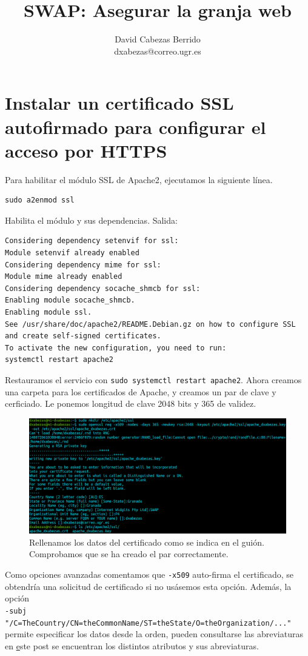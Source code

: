 \documentclass{article}
\title{\Huge SWAP: Asegurar la granja web\vspace{10mm}}
\author{\huge David Cabezas Berrido \vspace{10mm} \\ 
  \huge dxabezas@correo.ugr.es \vspace{10mm}}
\begin{document}
\maketitle
\tableofcontents
\newpage

\section{Instalar un certificado SSL autofirmado para configurar el acceso por HTTPS}

Para habilitar el módulo SSL de Apache2, ejecutamos la siguiente línea.

\begin{Verbatim}[tabsize=4]
sudo a2enmod ssl 
\end{Verbatim}
Habilita el módulo y sus dependencias. Salida:
\begin{Verbatim}[tabsize=4]
Considering dependency setenvif for ssl:
Module setenvif already enabled
Considering dependency mime for ssl:
Module mime already enabled
Considering dependency socache_shmcb for ssl:
Enabling module socache_shmcb.
Enabling module ssl.
See /usr/share/doc/apache2/README.Debian.gz on how to configure SSL and create self-signed certificates.
To activate the new configuration, you need to run:
systemctl restart apache2
\end{Verbatim}
Restauramos el servicio con \verb^sudo systemctl restart apache2^. Ahora creamos una carpeta para los certificados de Apache, y creamos un par de clave y cerficiado. Le ponemos longitud de clave 2048 bits y 365 de validez.

\begin{figure}[H]
	\centering
	\includegraphics[width=180mm]{imgs/cert-create}
	\caption{Rellenamos los datos del certificado como se indica en el guión. Comprobamos que se ha creado el par correctamente.}
	\label{fig:cert-create}
\end{figure}

Como opciones avanzadas comentamos que \texttt{-x509} auto-firma el certificado, se obtendría una solicitud de certificado si no usásemos
esta opción. Además, la opción \\ \texttt{-subj "/C=TheCountry/CN=theCommonName/ST=theState/O=theOrganization/..."} permite especificar los datos
desde la orden, pueden consultarse las abreviaturas en \href{https://stackoverflow.com/questions/6464129/certificate-subject-x-509}
este post se encuentran los distintos atributos y sus abreviaturas.
\end{document}
